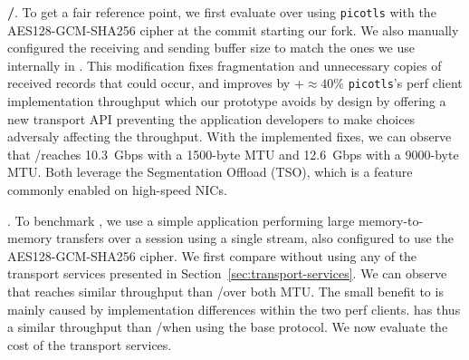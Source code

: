 \textbf{\tcp/\tls}. To get a fair reference point, we first evaluate \tls over 
\tcp using \texttt{picotls} with the AES128-GCM-SHA256 cipher at the commit 
starting our fork. We also manually configured the receiving and sending buffer size 
to match the ones we use internally in \tcpls. This modification fixes fragmentation and 
unnecessary copies of received \tls records that could occur, and improves by
+$\approx 40\%$ \texttt{picotls}'s perf client
implementation throughput which our \tcpls 
prototype avoids by design by offering a new transport API preventing the
application developers to make choices adversaly affecting the throughput. With
the implemented fixes, we can observe that \tcp/\tls reaches 10.3~Gbps 
with a 1500-byte MTU and 12.6~Gbps with a 9000-byte MTU. Both leverage the 
\tcp Segmentation Offload (TSO), which is a feature commonly enabled on 
high-speed NICs.

\textbf{\tcpls}.
To benchmark \tcpls, we use a simple application performing large 
memory-to-memory transfers over a \tcpls session using a single stream, also
configured to use the AES128-GCM-SHA256 cipher. 
We first compare \tcpls without using any of the transport services 
presented in Section~\ref{sec:transport-services}. We can observe that 
\tcpls reaches similar throughput than \tls/\tcp over both 
MTU. The small benefit to \tcpls is mainly caused by implementation differences
within the two perf clients. \tcpls has thus a similar throughput than \tcp/\tls when using the base 
protocol. We now evaluate the cost of the transport services.


